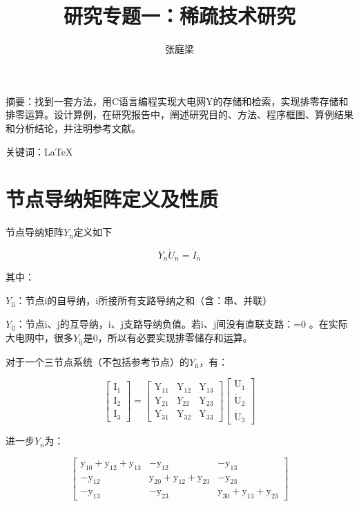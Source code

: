 \documentclass{ctexart} %
\title{研究专题一：稀疏技术研究}
\author{张庭梁}
\begin{document}
\maketitle

摘要：找到一套方法，用C语言编程实现大电网Y的存储和检索，实现排零存储和排零运算。设计算例，在研究报告中，阐述研究目的、方法、程序框图、算例结果和分析结论，并注明参考文献。


关键词：\LaTeX



\section{节点导纳矩阵定义及性质}
节点导纳矩阵$Y_{\mathrm{n}}$定义如下

\begin{equation}
Y_{n} \dot{U}_{n}=\dot{I}_{n}
\end{equation}

其中：

$Y_{\mathrm{ii}}$：节点i的自导纳，i所接所有支路导纳之和（含：串、并联）

$Y_{\mathrm{ij}}$：节点i、j的互导纳，i、j支路导纳负值。若i、j间没有直联支路：=0 。在实际大电网中，很多$Y_{\mathrm{ij}}$是0，所以有必要实现排零储存和运算。

对于一个三节点系统（不包括参考节点）的$Y_{\mathrm{n}}$，有：

\begin{equation}
\left[ \begin{array}{l}{\mathrm{I}_{1}} \\ {\mathrm{I}_{2}} \\ {\mathrm{I}_{3}}\end{array}\right]=\left[ \begin{array}{lll}{\mathrm{Y}_{11}} & {\mathrm{Y}_{12}} & {\mathrm{Y}_{13}} \\ {\mathrm{Y}_{21}} & {Y_{22}} & {\mathrm{Y}_{23}} \\ {\mathrm{Y}_{31}} & {\mathrm{Y}_{32}} & {\mathrm{Y}_{33}}\end{array}\right] \left[ \begin{array}{l}{\mathrm{U}_{1}} \\ {\dot{\mathrm{U}}_{2}} \\ {\dot{\mathrm{U}}_{3}}\end{array}\right]
\end{equation}

进一步$Y_{\mathrm{n}}$为：

\begin{equation}
\left[ \begin{array}{ccc}{\mathrm{y}_{10}+\mathrm{y}_{12}+\mathrm{y}_{13}} & {-\mathrm{y}_{12}} & {-\mathrm{y}_{13}} \\ {-\mathrm{y}_{12}} & {\mathrm{y}_{20}+\mathrm{y}_{12}+\mathrm{y}_{23}} & {-\mathrm{y}_{23}} \\ {\mathrm{-y}_{13}} & {-\mathrm{y}_{23}} & {\mathrm{y}_{30}+\mathrm{y}_{13}+\mathrm{y}_{23}}\end{array}\right]
\end{equation}
\end{document}
